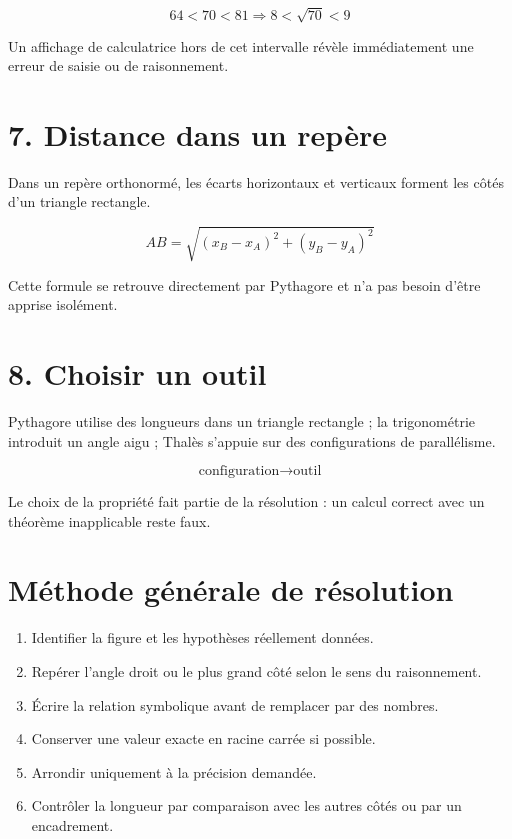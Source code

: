 \[
64<70<81\Rightarrow8<\sqrt{70}<9
\]

\begin{exemple}
Un affichage de calculatrice hors de cet intervalle révèle immédiatement une erreur de saisie ou de raisonnement.
\end{exemple}

\section{7. Distance dans un repère}
Dans un repère orthonormé, les écarts horizontaux et verticaux forment les côtés d’un triangle rectangle.

\[
AB=\sqrt{(x_B-x_A)^2+(y_B-y_A)^2}
\]

\begin{exemple}
Cette formule se retrouve directement par Pythagore et n’a pas besoin d’être apprise isolément.
\end{exemple}

\section{8. Choisir un outil}
Pythagore utilise des longueurs dans un triangle rectangle ; la trigonométrie introduit un angle aigu ; Thalès s’appuie sur des configurations de parallélisme.

\[
\text{configuration}\rightarrow\text{outil}
\]

\begin{exemple}
Le choix de la propriété fait partie de la résolution : un calcul correct avec un théorème inapplicable reste faux.
\end{exemple}

\section{Méthode générale de résolution}
\begin{methode}
\begin{enumerate}
\item Identifier la figure et les hypothèses réellement données.
\item Repérer l’angle droit ou le plus grand côté selon le sens du raisonnement.
\item Écrire la relation symbolique avant de remplacer par des nombres.
\item Conserver une valeur exacte en racine carrée si possible.
\item Arrondir uniquement à la précision demandée.
\item Contrôler la longueur par comparaison avec les autres côtés ou par un encadrement.
\end{enumerate}
\end{methode}


